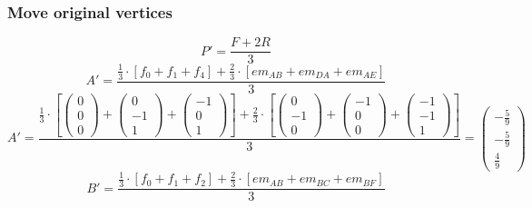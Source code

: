 \documentclass{article}
\begin{document}
\subsubsection{Move original vertices}
\[P'=\frac{F+2R}{3}\]
\[A'=\frac{\frac{1}{3}\cdot\left[f_0+f_1+f_4\right]+
\frac{2}{3}\cdot\left[em_{AB}+em_{DA}+em_{AE}\right]
}{3}\]
\[A'=\frac{\frac{1}{3}\cdot\left[
\left({\begin{array}{c} 0 \\  0 \\ 0 \end{array}}\right)+
\left({\begin{array}{c} 0 \\  -1 \\ 1 \end{array}}\right)+
\left({\begin{array}{c} -1 \\  0 \\ 1 \end{array}}\right)\right]+
\frac{2}{3}\cdot\left[
\left({\begin{array}{c} 0 \\  -1 \\ 0 \end{array}}\right)+
\left({\begin{array}{c} -1 \\  0 \\ 0 \end{array}}\right)+
\left({\begin{array}{c} -1 \\  -1 \\ 1 \end{array}}\right)\right]
}{3}=\left({\begin{array}{c} -\frac{5}{9} \\  -\frac{5}{9} \\ \frac{4}{9} \end{array}}\right)\]
\[B'=\frac{\frac{1}{3}\cdot\left[f_0+f_1+f_2\right]+
\frac{2}{3}\cdot\left[em_{AB}+em_{BC}+em_{BF}\right]
}{3}\]
\end{document}
